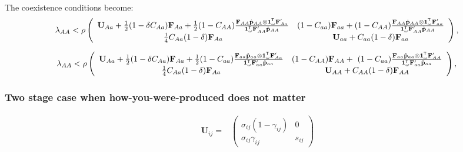 \documentclass[11pt]{article}
\def\mbf#1{\mathbf{#1}}
\newcommand{\tr}{{\mbox{\tiny \sf T}}}
\begin{document}
The coexistence conditions become:
\begin{equation} \label{eq:coexist_bigAA}
	\lambda_{AA} < 
			\rho\left(\begin{array}{cc}
\mathbf{U}_{Aa} + \frac{1}{2} (1 - \delta C_{Aa}) \mbf{F}_{Aa} +\frac{1}{2} (1 - C_{AA})\frac{\mbf{F}_{AA}\hat{\mbf{p}}_{AA}\otimes \mathbf{1}^\tr_{\omega} \mathbf{F}_{Aa}^\prime}{\mathbf{1}^\tr_\omega \mathbf{F}_{AA}^\prime \hat{\mathbf{p}}_{AA}	} & (1-C_{aa}) \mbf{F}_{aa}+ (1 - C_{AA})\frac{\mbf{F}_{AA}\hat{\mbf{p}}_{AA}\otimes \mathbf{1}^\tr_{\omega} \mathbf{F}_{aa}^\prime}{\mathbf{1}^\tr_\omega \mathbf{F}_{AA}^\prime \hat{\mathbf{p}}_{AA}	}  \\
\frac{1}{4} C_{Aa} (1 - \delta) \mbf{F}_{Aa}  &\mathbf{U}_{aa} +C_{aa} (1 - \delta) \mbf{F}_{aa}  \\ 
			\end{array} \right), \\ 
\end{equation} 

\begin{equation} \label{eq:coexist_baa}
	\lambda_{AA} < 
			\rho\left(\begin{array}{cc}
\mathbf{U}_{Aa} + \frac{1}{2} (1 - \delta C_{Aa}) \mbf{F}_{Aa} +\frac{1}{2} (1 - C_{aa})\frac{\mbf{F}_{aa}\hat{\mbf{p}}_{aa}\otimes \mathbf{1}^\tr_{\omega} \mathbf{F}_{Aa}^\prime}{\mathbf{1}^\tr_\omega \mathbf{F}_{aa}^\prime \hat{\mathbf{p}}_{aa}	} & (1-C_{AA}) \mbf{F}_{AA}+\ (1 - C_{aa})\frac{\mbf{F}_{aa}\hat{\mbf{p}}_{aa}\otimes \mathbf{1}^\tr_{\omega} \mathbf{F}_{AA}^\prime}{\mathbf{1}^\tr_\omega \mathbf{F}_{aa}^\prime \hat{\mathbf{p}}_{aa}	} \\
\frac{1}{4} C_{Aa} (1 - \delta) \mbf{F}_{Aa}  &\mathbf{U}_{AA} +C_{AA} (1 - \delta) \mbf{F}_{AA}  \\ 
			\end{array} \right), \\ 
\end{equation} 

\subsubsection*{Two stage case when how-you-were-produced does not matter}


\begin{align*}
	\mbf{U}_{ij} = &\left(
					\begin{array}{cc}
						\sigma_{ij}(1 - \gamma_{ij}) & 0 \\
						\sigma_{ij} \gamma_{ij}     & s_{ij}
					\end{array}
				\right)  
\end{align*}
\end{document}
